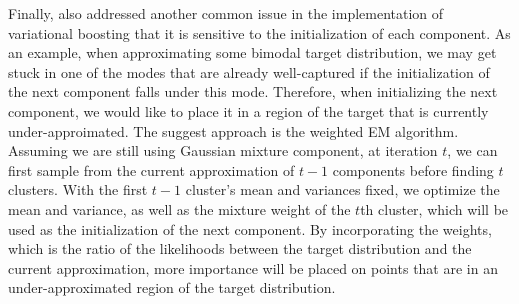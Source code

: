 Finally, \cite{miller2017variational} also addressed another common issue in the implementation of variational boosting that it is sensitive to the initialization of each component. As an example, when approximating some bimodal target distribution, we may get stuck in one of the modes that are already well-captured if the initialization of the next component falls under this mode. Therefore, when initializing the next component, we would like to place it in a region of the target that is currently under-approimated. The suggest approach is the weighted EM algorithm. Assuming we are still using Gaussian mixture component, at iteration $t$, we can first sample from the current approximation of $t-1$ components before finding $t$ clusters. With the first $t-1$ cluster's mean and variances fixed, we optimize the mean and variance, as well as the mixture weight of the $t$th cluster, which will be used as the initialization of the next component. By incorporating the weights, which is the ratio of the likelihoods between the target distribution and the current approximation, more importance will be placed on points that are in an under-approximated region of the target distribution.
